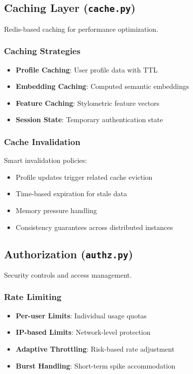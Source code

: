 \documentclass[12pt,a4paper]{article}
\begin{document}
\subsection{Caching Layer (\texttt{cache.py})}

Redis-based caching for performance optimization.

\subsubsection{Caching Strategies}
\begin{itemize}
    \item \textbf{Profile Caching}: User profile data with TTL
    \item \textbf{Embedding Caching}: Computed semantic embeddings
    \item \textbf{Feature Caching}: Stylometric feature vectors
    \item \textbf{Session State}: Temporary authentication state
\end{itemize}

\subsubsection{Cache Invalidation}
Smart invalidation policies:
\begin{itemize}
    \item Profile updates trigger related cache eviction
    \item Time-based expiration for stale data
    \item Memory pressure handling
    \item Consistency guarantees across distributed instances
\end{itemize}

\subsection{Authorization (\texttt{authz.py})}

Security controls and access management.

\subsubsection{Rate Limiting}
\begin{itemize}
    \item \textbf{Per-user Limits}: Individual usage quotas
    \item \textbf{IP-based Limits}: Network-level protection
    \item \textbf{Adaptive Throttling}: Risk-based rate adjustment
    \item \textbf{Burst Handling}: Short-term spike accommodation
\end{itemize}
\end{document}

